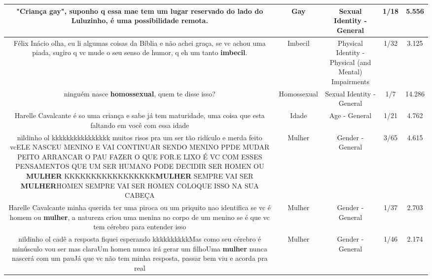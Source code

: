\documentclass[11pt]{article}
\newlength\mylength
\begin{document}
\begin{center}
\begin{longtable}{|C{.65\mylength}|C{.30\mylength}|C{.12\mylength}|C{.12\mylength}|C{.12\mylength}|}
  \small "Criança \textbf{gay}", suponho q essa mae tem um lugar reservado do lado do Luluzinho, é uma possibilidade remota.\normalsize   & Gay & Sexual Identity - General & 1/18 & 5.556 \\  \hline
  \small Félix Inácio olha, eu li algumas coisas da Bíblia e não achei graça, se vc achou uma piada, sugiro q vc mude o seu senso de humor, q eh um tanto \textbf{imbecil}.\normalsize   & Imbecil & Physical Identity - Physical (and Mental) Impairments & 1/32 & 3.125 \\  \hline
  \small ninguém nasce \textbf{homossexual}, quem te disse isso?\normalsize   & Homossexual & Sexual Identity - General & 1/7 & 14.286 \\  \hline
  \small Harelle Cavalcante é so uma criança e sabe já tem maturidade, uma coisa que esta faltando em você com essa idade\normalsize   & Idade & Age - General & 1/21 & 4.762 \\  \hline
  \small nildinho ol kkkkkkkkkkkkkkkk muitos risos pra um ser tão ridículo e merda feito vcELE NASCEU MENINO E VAI CONTINUAR SENDO MENINO PPDE MUDAR PEITO ARRANCAR O PAU FAZER O QUE FOR.E LIXO É VC COM ESSES PENSAMENTOS QUE UM SER HUMANO PODE DECIDIR SER HOMEN OU \textbf{MULHER} KKKKKKKKKKKKKKKKK\textbf{MULHER} SEMPRE VAI SER \textbf{MULHER}HOMEN SEMPRE VAI SER HOMEN COLOQUE ISSO NA SUA CABEÇA\normalsize   & Mulher & Gender - General & 3/65 & 4.615 \\  \hline
  \small Harelle Cavalcante minha querida ter uma piroca ou um priquito nao identifica se vc é homem ou \textbf{mulher}, a natureza criou uma menina no corpo de um menino se é que vc tem cérebro para entender isso\normalsize   & Mulher & Gender - General & 1/37 & 2.703 \\  \hline
  \small nildinho ol cadê a resposta fiquei esperando kkkkkkkkkkMas como seu cérebro é minúsculo vou ser mas claraUm homen nunca irá gerar um filhoUma \textbf{mulher} nunca nascerá com um pauJá que vc não tem minha resposta, passar bem viu e acorda pra real\normalsize   & Mulher & Gender - General & 1/46 & 2.174 \\  \hline

\end{longtable}
\end{center}
\end{document}
